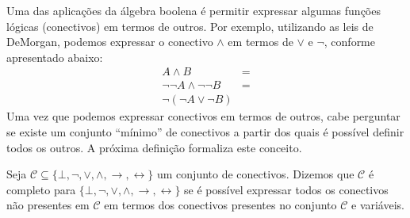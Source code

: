 Uma das aplicações da álgebra boolena é permitir expressar algumas
funções lógicas (conectivos) em termos de outros. Por exemplo,
utilizando as leis de DeMorgan, podemos expressar o conectivo $\land$
em termos de $\lor$ e $\neg$, conforme apresentado abaixo:
\[
\begin{array}{lc}
  A \land B & = \\
\neg\neg A \land \neg\neg B & = \\
\neg(\neg A \lor \neg B)
\end{array}
\]
Uma vez que podemos expressar conectivos em termos de outros, cabe
perguntar se existe um conjunto ``mínimo'' de conectivos a partir dos
quais é possível definir todos os outros. A próxima definição
formaliza este conceito.

\begin{Definition}
Seja
$\mathcal{C}\subseteq\{\bot,\neg,\lor,\land,\to,\leftrightarrow\}$ um
conjunto de conectivos. Dizemos que $\mathcal{C}$ é completo para
$\{\bot,\neg,\lor,\land,\to,\leftrightarrow\}$ se é possível expressar
todos os conectivos não presentes em $\mathcal{C}$ em termos dos
conectivos presentes no conjunto $\mathcal{C}$ e variáveis.
\end{Definition}

